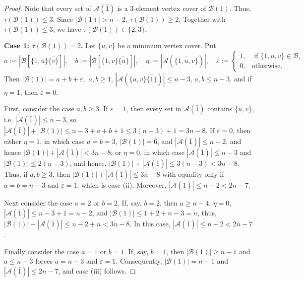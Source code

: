 \documentclass[a4paper,11pt]{article}
\newcommand{\m}{\mathcal}
\begin{document}
\begin{proof}
Note that
every set of $\m A(\bar 1)$ is a $3$-element vertex cover of
$\m B(1)$. Thus, $\tau(\m B(1))\le 3$.
Since $|\m B(1)|>n-2$, $\tau(\m B(1))\ge 2$. Together with $\tau(\m B(1))\le3$, we have $\tau(\m B(1))\in\{2,3\}.$ 

{\bf Case 1: $\tau(\m B(1))=2$. }
Let $\{u,v\}$ be a minimum vertex
cover. Put 
\[
a:=|\m B[\{1,u\}\overline{\{v\}}]|,
\quad
b:=|\m B[\{1,v\}\overline{\{u\}}]|,
\quad
\eta:=|\m A(\overline{\{1,u,v\}})|,
\quad
\varepsilon:=
\begin{cases}
1,& \text{ if } \{1,u,v\}\in \m B,\\
0,& \text{otherwise}.
\end{cases}
\]
Then $|\m B(1)|=a+b+\varepsilon,$ $a,b\ge1$, $|\m A(\{u,v\}\overline{\{1\}})|\le n-3$, $a,b \le n-3$,
and if $\eta=1$, then $\varepsilon=0$.

First, consider the case $a,b\ge3$. If $\varepsilon=1$, then every set in $\m A(\bar1)$ contains $\{u,v\}$, i.e. $|\m A(\bar1)|\le {n-3}$, so $|\m A(\bar1)|+|\m B(1)|\le {n-3}+a+b+1\le 3(n-3)+1=3n-8$.
If $\varepsilon=0$, then either $\eta=1$, in which case $a=b=3$, $|\m B(1)|=6$, and $|\m A(\bar1)|\le n-2$, and hence $|\m B(1)|+|\m A(\bar1)|<3n-8$; or $\eta=0$, in which case 
$|\m A(\bar1)|\le n-3$ and $|\m B(1)|\le 2(n-3)$, and hence, 
$|\m B(1)|+|\m A(\bar1)|\le 3(n-3)<3n-8$. Thus, if $a,b\ge3$, then $|\m B(1)|+|\m A(\bar1)|\le 3n-8$ with equality only if $a=b=n-3$ and $\varepsilon=1$, which is case \rm(ii). Moreover, $|\m A(\bar1)|\le n-2<2n-7$. 

Next consider the case $a=2$ or $b=2$. If, say, $b=2$, then $a\ge n-4$, $\eta=0$, $|\m A(\bar1)|\le n-3+1=n-2$, and $|\m B(1)|\le 1+2+n-3=n$, thus,
$|\m B(1)|+|\m A(\bar1)|\le n-2+n<3n-8$. In this case, $|\m A(\bar1)|\le n-2<2n-7$. 

Finally consider the case $a=1$ or $b=1$. If, say, $b=1$, then $|\m B(1)|\ge n-1$ and  $a\le n-3$ forces $a= n-3$ and $\varepsilon=1$. 
Consequently, $|\m B(1)|= n-1$ and $|\m A(\bar1)|\le 2n-7$,
and case \rm(iii) follows. 


\end{proof}
\end{document}
